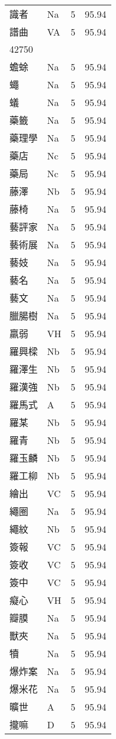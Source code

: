 \documentclass[twocolumn]{book}
\begin{document}
\begin{supertabular}{llrr}
識者 & Na & 5 &  95.94\\
譜曲 & VA & 5 &  95.94\\
42750\\
蟾蜍 & Na & 5 &  95.94\\
蠅 & Na & 5 &  95.94\\
蟻 & Na & 5 &  95.94\\
藥籤 & Na & 5 &  95.94\\
藥理學 & Na & 5 &  95.94\\
藥店 & Nc & 5 &  95.94\\
藥局 & Nc & 5 &  95.94\\
藤澤 & Nb & 5 &  95.94\\
藤椅 & Na & 5 &  95.94\\
藝評家 & Na & 5 &  95.94\\
藝術展 & Na & 5 &  95.94\\
藝妓 & Na & 5 &  95.94\\
藝名 & Na & 5 &  95.94\\
藝文 & Na & 5 &  95.94\\
臘腸樹 & Na & 5 &  95.94\\
羸弱 & VH & 5 &  95.94\\
羅興樑 & Nb & 5 &  95.94\\
羅澤生 & Nb & 5 &  95.94\\
羅漢強 & Nb & 5 &  95.94\\
羅馬式 & A & 5 &  95.94\\
羅某 & Nb & 5 &  95.94\\
羅青 & Nb & 5 &  95.94\\
羅玉麟 & Nb & 5 &  95.94\\
羅工柳 & Nb & 5 &  95.94\\
繪出 & VC & 5 &  95.94\\
繩圈 & Na & 5 &  95.94\\
繩紋 & Nb & 5 &  95.94\\
簽報 & VC & 5 &  95.94\\
簽收 & VC & 5 &  95.94\\
簽中 & VC & 5 &  95.94\\
癡心 & VH & 5 &  95.94\\
瓣膜 & Na & 5 &  95.94\\
獸夾 & Na & 5 &  95.94\\
犢 & Na & 5 &  95.94\\
爆炸案 & Na & 5 &  95.94\\
爆米花 & Na & 5 &  95.94\\
曠世 & A & 5 &  95.94\\
攏嘛 & D & 5 &  95.94\\

\end{supertabular}
\end{document}
